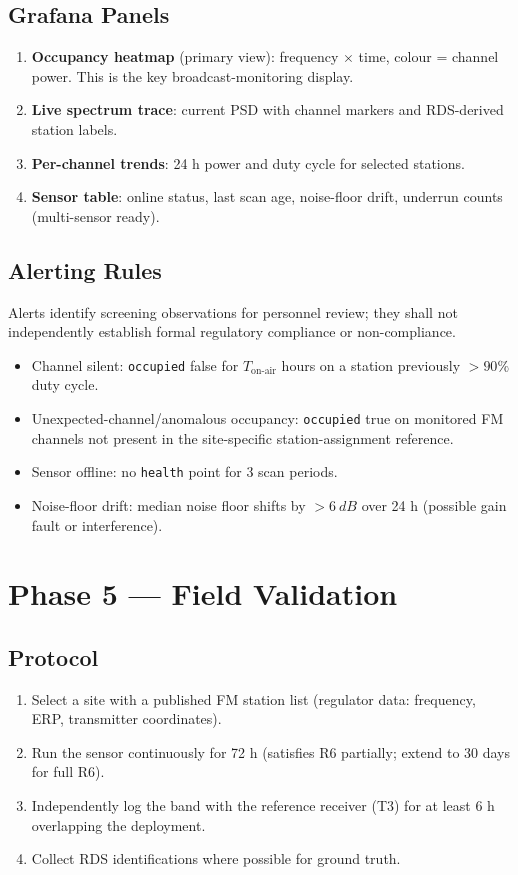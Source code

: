 \documentclass[12pt,a4paper]{report}
\begin{document}
 \subsection*{Grafana Panels}
 \begin{enumerate}
 	\item \textbf{Occupancy heatmap} (primary view): frequency $\times$ time,
 	colour = channel power. This is the key broadcast-monitoring display.
 	\item \textbf{Live spectrum trace}: current PSD with channel markers and
 	RDS-derived station labels.
 	\item \textbf{Per-channel trends}: 24 h power and duty cycle for selected
 	stations.
 	\item \textbf{Sensor table}: online status, last scan age, noise-floor
 	drift, underrun counts (multi-sensor ready).
 \end{enumerate}
 \subsection*{Alerting Rules}

Alerts identify screening observations for personnel review; they shall not independently establish formal regulatory compliance or non-compliance.
 \begin{itemize}
 	\item Channel silent: \texttt{occupied} false for $T_{\text{on-air}}$ hours
 	on a station previously $>90\%$ duty cycle.
 	\item Unexpected-channel/anomalous occupancy: \texttt{occupied} true on monitored FM channels not present in the site-specific station-assignment reference.
 	\item Sensor offline: no \texttt{health} point for 3 scan periods.
 	\item Noise-floor drift: median noise floor shifts by $>\SI{6}{dB}$ over
 	24 h (possible gain fault or interference).
 \end{itemize}
 \section{Phase 5 --- Field Validation}
 \subsection*{Protocol}
 \begin{enumerate}
 	\item Select a site with a published FM station list (regulator data:
 	frequency, ERP, transmitter coordinates).
 	\item Run the sensor continuously for 72 h (satisfies R6 partially;
 	extend to 30 days for full R6).
 	\item Independently log the band with the reference receiver (T3) for at
 	least 6 h overlapping the deployment.
 	\item Collect RDS identifications where possible for ground truth.
 \end{enumerate}
\end{document}
